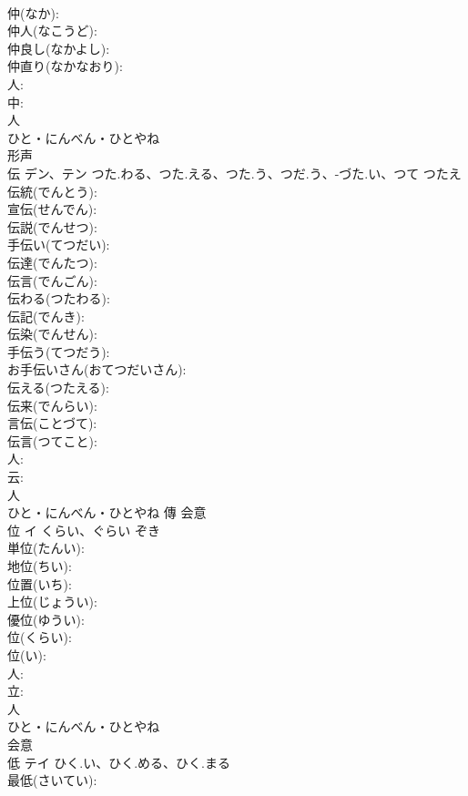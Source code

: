 \documentclass[8pt]{extreport}
\begin{document}
\begin{CJK}{UTF8}{min}
\\	仲(なか): 
\\	仲人(なこうど): 
\\	仲良し(なかよし): 
\\	仲直り(なかなおり): 
\\	人: 
\\	中: 
\\	人	
\\	ひと・にんべん・ひとやね	
\\	形声 
\\	伝	デン、テン	つた.わる、つた.える、つた.う、つだ.う、-づた.い、つて	つたえ	
\\	伝統(でんとう): 
\\	宣伝(せんでん): 
\\	伝説(でんせつ): 
\\	手伝い(てつだい): 
\\	伝達(でんたつ): 
\\	伝言(でんごん): 
\\	伝わる(つたわる): 
\\	伝記(でんき): 
\\	伝染(でんせん): 
\\	手伝う(てつだう): 
\\	お手伝いさん(おてつだいさん): 
\\	伝える(つたえる): 
\\	伝来(でんらい): 
\\	言伝(ことづて): 
\\	伝言(つてこと): 
\\	人: 
\\	云: 
\\	人	
\\	ひと・にんべん・ひとやね	傳	会意 
\\	位	イ	くらい、ぐらい	ぞき	
\\	単位(たんい): 
\\	地位(ちい): 
\\	位置(いち): 
\\	上位(じょうい): 
\\	優位(ゆうい): 
\\	位(くらい): 
\\	位(い): 
\\	人: 
\\	立: 
\\	人	
\\	ひと・にんべん・ひとやね	
\\	会意 
\\	低	テイ	ひく.い、ひく.める、ひく.まる		
\\	最低(さいてい): 

\end{CJK}
\end{document}
